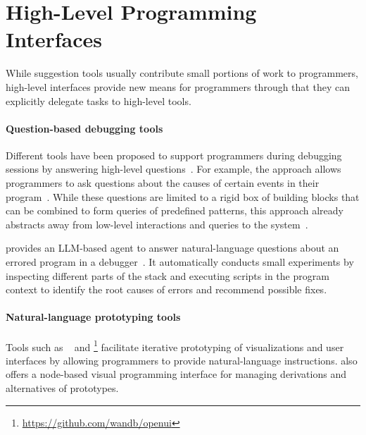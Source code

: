 
\section{High-Level Programming Interfaces}
\label{sec:related_work/interfaces}

While suggestion tools usually contribute small portions of work to programmers, high-level interfaces provide new means for programmers through that they can explicitly delegate tasks to high-level tools.

\paragraph{Question-based debugging tools}
\label{par:related_work/interfaces/debugging}

Different tools have been proposed to support programmers during debugging sessions by answering high-level questions~\cite{myers2004natural,deRoover2011soul}.
For example, the  approach allows programmers to ask questions about the causes of certain events in their program~\cite{ko2004designing}.
While these questions are limited to a rigid box of building blocks that can be combined to form queries of predefined patterns, this approach already abstracts away from low-level interactions and queries to the system~\cite{perscheid2014follow}.

 provides an LLM-based agent to answer natural-language questions about an errored program in a debugger~\cite{levin2024chatdbg}.
It automatically conducts small experiments by inspecting different parts of the stack and executing scripts in the program context to identify the root causes of errors and recommend possible fixes.

\paragraph{Natural-language prototyping tools}
\label{par:related_work/interfaces/prototyping}

Tools such as ~\cite{angert2023spellburst} and \footnote{\url{https://github.com/wandb/openui}} facilitate iterative prototyping of visualizations and user interfaces by allowing programmers to provide natural-language instructions.
 also offers a node-based visual programming interface for managing derivations and alternatives of prototypes.

